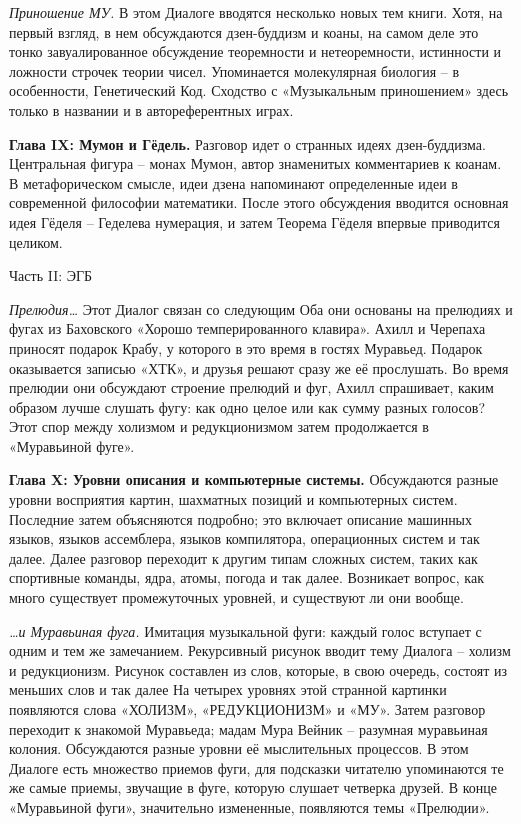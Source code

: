 \documentclass[../main.tex]{subfiles}
\begin{document}
\emph{Приношение МУ.}
В этом Диалоге вводятся несколько новых тем книги. Хотя, на первый взгляд, в нем обсуждаются дзен-буддизм и коаны, на самом деле это тонко завуалированное обсуждение теоремности и нетеоремности, истинности и ложности строчек теории чисел. Упоминается молекулярная биология \--- в особенности, Генетический Код. Сходство с «Музыкальным приношением» здесь только в названии и в автореферентных играх.

\textbf{Глава IX: Мумон и Гёдель.}
Разговор идет о странных идеях дзен-буддизма. Центральная фигура \--- монах Мумон, автор знаменитых комментариев к коанам. В метафорическом смысле, идеи дзена напоминают определенные идеи в современной философии математики. После этого обсуждения вводится основная идея Гёделя \--- Геделева нумерация, и затем Теорема Гёделя впервые приводится целиком.


\begin{center}
    \Large
    Часть II: ЭГБ
\end{center}

\emph{Прелюдия\ldots}
Этот Диалог связан со следующим Оба они основаны на прелюдиях и фугах из Баховского «Хорошо темперированного клавира». Ахилл и Черепаха приносят подарок Крабу, у которого в это время в гостях Муравьед. Подарок оказывается записью «ХТК», и друзья решают сразу же её прослушать. Во время прелюдии они обсуждают строение прелюдий и фуг, Ахилл спрашивает, каким образом лучше слушать фугу: как одно целое или как сумму разных голосов? Этот спор между холизмом и редукционизмом затем продолжается в «Муравьиной фуге».

\textbf{Глава X: Уровни описания и компьютерные системы.}
Обсуждаются разные уровни восприятия картин, шахматных позиций и компьютерных систем. Последние затем объясняются подробно; это включает описание машинных языков, языков ассемблера, языков компилятора, операционных систем и так далее. Далее разговор переходит к другим типам сложных систем, таких как спортивные команды, ядра, атомы, погода и так далее. Возникает вопрос, как много существует промежуточных уровней, и существуют ли они вообще.

\emph{\ldots и Муравьиная фуга.}
Имитация музыкальной фуги: каждый голос вступает с одним и тем же замечанием. Рекурсивный рисунок вводит тему Диалога \--- холизм и редукционизм. Рисунок составлен из слов, которые, в свою очередь, состоят из меньших слов и так далее На четырех уровнях этой странной картинки появляются слова «ХОЛИЗМ», «РЕДУКЦИОНИЗМ» и «МУ». Затем разговор переходит к знакомой Муравьеда; мадам Мура Вейник \--- разумная муравьиная колония. Обсуждаются разные уровни её мыслительных процессов. В этом Диалоге есть множество приемов фуги, для подсказки читателю упоминаются те же самые приемы, звучащие в фуге, которую слушает четверка друзей. В конце «Муравьиной фуги», значительно измененные, появляются темы «Прелюдии».
\end{document}
